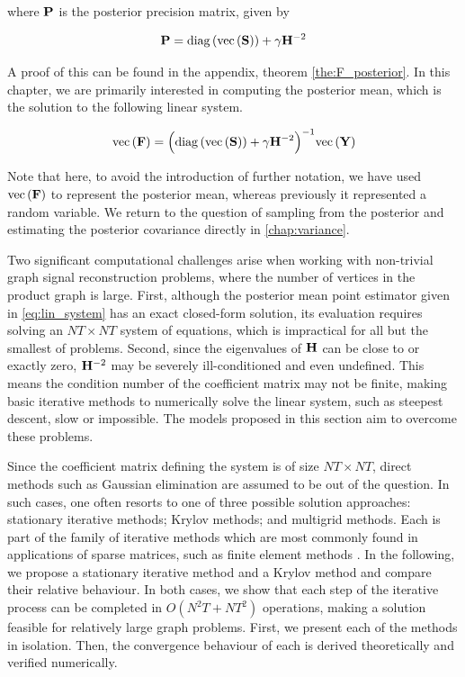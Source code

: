 \noindent where $\mathbf{P}$ is the posterior precision matrix, given by 

\begin{equation}
    \label{eq:P_post_gsr}
    \mathbf{P} = \text{\textup{diag}}\left(\text{\textup{vec}}\left(\mathbf{S}\right)\right) + \gamma  \mathbf{H}^{-2}
\end{equation}

A proof of this can be found in the appendix, theorem \ref{the:F_posterior}. In this chapter, we are primarily interested in computing the posterior mean, which is the solution to the following linear system.

\begin{equation}
    \label{eq:lin_system}
    \text{\textup{vec}}\left(\mathbf{F}\right) = \Big(\text{\textup{diag}}\left(\text{\textup{vec}}\left(\mathbf{S}\right)\right) + \gamma  \mathbf{H}^{-2}\Big)^{-1} \text{\textup{vec}}\left(\mathbf{Y}\right)
\end{equation}

Note that here, to avoid the introduction of further notation, we have used $\text{\textup{vec}}\left(\mathbf{F}\right)$ to represent the posterior mean, whereas previously it represented a random variable. We return to the question of sampling from the posterior and estimating the posterior covariance directly in \cref{chap:variance}.

Two significant computational challenges arise when working with non-trivial graph signal reconstruction problems, where the number of vertices in the product graph is large. First, although the posterior mean point estimator given in \cref{eq:lin_system} has an exact closed-form solution, its evaluation requires solving an $NT \times NT$ system of equations, which is impractical for all but the smallest of problems. Second, since the eigenvalues of $\mathbf{H}$ can be close to or exactly zero, $\mathbf{H}^{-2}$ may be severely ill-conditioned and even undefined. This means the condition number of the coefficient matrix may not be finite, making basic iterative methods to numerically solve the linear system, such as steepest descent, slow or impossible. The models proposed in this section aim to overcome these problems.


Since the coefficient matrix defining the system is of size $NT \times NT $, direct methods such as Gaussian elimination are assumed to be out of the question. In such cases, one often resorts to one of three possible solution approaches: stationary iterative methods; Krylov methods; and multigrid methods. Each is part of the family of iterative methods which are most commonly found in applications of sparse matrices, such as finite element methods \citep{Brenner2008}. In the following, we propose a stationary iterative method and a Krylov method and compare their relative behaviour. In both cases, we show that each step of the iterative process can be completed in $O(N^2T + NT^2)$ operations, making a solution feasible for relatively large graph problems. First, we present each of the methods in isolation. Then, the convergence behaviour of each is derived theoretically and verified numerically.

